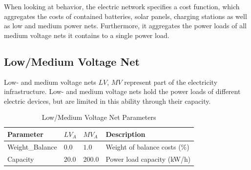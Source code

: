 



When looking at behavior, the electric network specifies a cost function, which aggregates the costs of contained batteries, solar panels, charging stations as well as low and medium power nets. Furthermore, it aggregates the power loads of all medium voltage nets it contains to a single power load.

\subsection{Low/Medium Voltage Net}

Low- and medium voltage nets $LV$, $MV$ represent part of the electricity infrastructure. 
Low- and medium voltage nets hold the power loads of different electric devices, but are limited in this ability through their capacity.

\begin{table}[h]
	\renewcommand{\arraystretch}{1.3}
	\caption{Low/Medium Voltage Net Parameters}
	\centering
	\begin{tabular}{llll}
		\hline
		\textbf{Parameter}   & \textbf{$LV_{A}$} & \textbf{$MV_{A}$}  & Description \\ \hline
		Weight\_Balance       & $0.0$ & $1.0$ & Weight of balance costs (\%) \\  
		Capacity          & $20.0$ & $200.0$ & Power load capacity (kW/h)     \\ \hline
	\end{tabular}
\end{table}


